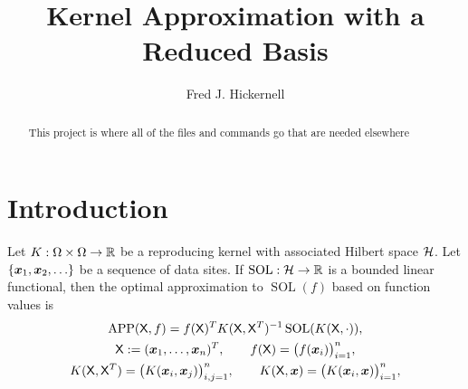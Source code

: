 \documentclass{amsart}
\DeclareMathOperator{\SOL}{SOL}
\DeclareMathOperator{\APP}{APP}
\begin{document}
\title{Kernel Approximation with a Reduced Basis}
\author{Fred J. Hickernell}
\begin{abstract}This project is where all of the files and commands go that are needed elsewhere
\end{abstract}

\maketitle

\section{Introduction}\label{sec:intro}
Let $K:\Omega \times \Omega \to \mathbb{R}$ be a reproducing kernel with associated Hilbert space $\mathcal{H}$. Let $\{\boldsymbol{x}_1, \boldsymbol{x}_2, \ldots\}$ be a sequence of data sites.  If $\SOL: \ch \to \reals$ is a bounded linear functional, then the optimal approximation to $\SOL(f)$ based on function values  is
\begin{subequations}  \label{eq:bestappx}
\begin{gather}
    \APP(\mX,f) =  f(\mX)^T K(\mX,\mX^T)^{-1}\SOL(K(\mX,\cdot)), \\
    \mX := (\vx_1, \dots, \vx_n)^T, \qquad  f(\mX) = \bigl(f(\vx_i) \bigr)_{i=1}^n, \\
    K(\mX,\mX^T) = \bigl(K(\vx_i,\vx_j)\bigr)_{i,j=1}^n, \qquad
     K(\mX,\vx) = \bigl(K(\vx_i,\vx)\bigr)_{i=1}^n,
\end{gather}
\end{subequations}
\end{document}

